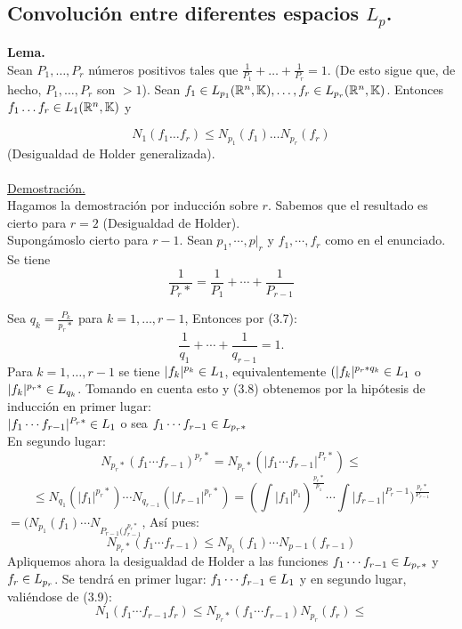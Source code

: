\subsection{Convolución entre diferentes espacios $L_p$.}

\textbf{Lema.} \\
Sean $P_1, \ldots,P_r$ números positivos tales que $\frac{1}{P_1}+\ldots+\frac{1}{P_r}=1$. (De esto sigue que, de hecho, $P_1,\ldots,P_r$ son $>1$). Sean $f_1 \in L_{p_1} (\mathbb{R}^n, \mathbb{K}),\ldots, f_r \in L_{p_r}(\mathbb{R}^n ,\mathbb{K})$. Entonces $f_1 \ldots f_r \in L_1 (\mathbb{R}^n,\mathbb{K})$ y 

$$
N_1 (f_1 \ldots f_r) \leq N_{p_1} (f_1) \ldots N_{p_r} (f_r)
$$
(Desigualdad de Holder generalizada). \\ \\
\underline{Demostración.}\\

Hagamos la demostración por inducción sobre $r$. Sabemos que el resultado es cierto para $r=2$ (Desigualdad de Holder). \\
Supongámoslo cierto para $r-1$. Sean $p_1, \cdots, p|_r$ y $f_1, \cdots ,f_r$ como en el enunciado. Se tiene 
\begin{equation}
\frac{1}{P_r *}=\frac{1}{P_1}+ \cdots+ \frac{1}{P_{r-1}}
\end{equation}

Sea $q_k=\frac{P_k}{p_r *}$ para $k=1,\ldots, r-1$, Entonces por (3.7): 
\begin{equation}
\frac{1}{q_1}+\cdots + \frac{1}{q_{r-1}}=1.
\end{equation}
  Para $k=1, \ldots, r-1$ se tiene $|f_k|^{p_k} \in L_1$, equivalentemente $(|f_k|^{p_r * q_k} \in L_1$ o $|f_k|^{p_r *} \in L_{q_k}$. Tomando en cuenta esto y (3.8) obtenemos por la hipótesis de inducción en primer lugar: \\
 $|f_1 \cdots f_{r-1}|^{P_r *} \in L_1$ o sea $f_1 \cdots f_{r-1} \in L_{p_r *}$ \\
 En segundo lugar:
 $$
 N_{p_r *} (f_1 \cdots f_{r-1})^{p_r *}= N_{p_r *} (|f_1 \cdots f_{r-1}|^{P_r*}) \leq 
 $$
 $$
 \leq N_{q_1} (|f_1|^{p_r *}) \cdots N_{q_{r-1}} (|f_{r-1}|^{p_r *})=(\int |f_1|^{p_1})^{\frac{p_r *}{p_1}} \cdots \int |f_{r-1} |^{P_r-1})^{\frac{p_r *}{P_{r-1}}}
 $$
 $=(N_{p_1} (f_1) \cdots N_{P_{r-1} (f_{r-1}^{p_r *}}$, Así pues: 
 \begin{equation}
 N_{p_r *}(f_1 \cdots f_{r-1}) \leq N_{p_1} (f_1) \cdots N_{p-1} (f_{r-1})
 \end{equation}
 Apliquemos ahora la desigualdad de Holder a las funciones $f_1 \cdots f_{r-1} \in L_{p_r *}$ y $f_r \in L_{p_r}$. Se tendrá en primer lugar: $f_1 \cdots f_{r-1} \in L_1$ y en segundo lugar, valiéndose de (3.9):
 $$N_1 (f_1 \cdots f_{r-1} f_r) \leq N_{p_r *} (f_1 \cdots f_{r-1})N_{p_r} (f_r) \leq$$
 
